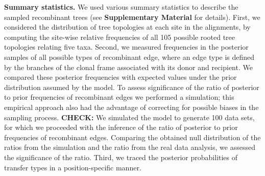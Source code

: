 \documentclass[12pt]{article}
\begin{document}

{\bf Summary statistics.}  We used various summary statistics to describe
the sampled recombinant trees (see \textbf{Supplementary Material} for details). 
First, we considered the distribution of
tree topologies at each site in the alignments, by computing the site-wise
relative frequencies of all 105 possible rooted tree topologies relating five
taxa. Second, we measured frequencies in the posterior samples
of all possible types of recombinant edge, where an edge
type is defined by the branches of the clonal frame associated with its
donor and recipient.
We compared these posterior frequencies with 
expected values under the prior distribution assumed by the model.
To assess significance of the ratio of posterior to prior frequencies of
recombinant edges we performed a simulation; 
this empirical approach also 
had the advantage of correcting for possible biases in the sampling
process. 
\textbf{CHECK:}
We simulated the model to generate 100 data sets, for which we proceeded with
the inference of the ratio of posterior to prior frequencies of recombinant
edges. Comparing the obtained null distribution of the ratios from the
simulation and the ratio from the real data analysis, we assessed the
significance of the ratio.
Third,
we traced the posterior
probabilities of transfer types in a position-specific manner. 
\end{document}
